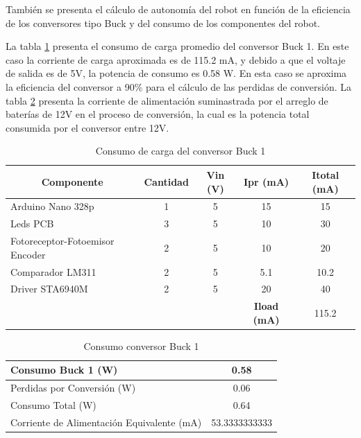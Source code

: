 También se presenta el cálculo de autonomía del robot en función de la eficiencia de los conversores tipo Buck y del consumo de los componentes del robot.

La tabla \ref{Buck1} presenta el consumo de carga promedio del conversor Buck 1. En este caso la corriente de carga aproximada es de 115.2 mA, y debido a que el voltaje de salida es de 5V, la potencia de consumo es 0.58 W. En esta caso se aproxima la eficiencia del conversor a 90\% para el cálculo de las perdidas de conversión. La tabla \ref{Buck1Perdidas} presenta la corriente de alimentación suminastrada por el arreglo de baterías de 12V en el proceso de conversión, la cual es la potencia total consumida por el conversor entre 12V.

\begin{table}[htbp]
	\caption{Consumo de carga del conversor Buck 1}
	\begin{tabular}{|l|c|c|c|c|}
		\hline
		\multicolumn{1}{|c|}{\textbf{Componente}} & \textbf{Cantidad} & \textbf{ Vin (V)} & \textbf{ Ipr (mA)} & \textbf{Itotal (mA)} \\ \hline
		Arduino Nano 328p & 1 & 5 & 15 & 15 \\ \hline
		Leds PCB & 3 & 5 & 10 & 30 \\ \hline
		Fotoreceptor-Fotoemisor Encoder & 2 & 5 & 10 & 20 \\ \hline
		Comparador LM311 & 2 & 5 & 5.1 & 10.2 \\ \hline
		Driver STA6940M & 2 & 5 & 20 & 40 \\ \hline
		& \multicolumn{1}{l|}{} & \multicolumn{1}{l|}{} & \textbf{Iload (mA)} & 115.2 \\ \hline
	\end{tabular}
	\label{Buck1}
\end{table}



\begin{table}[htbp]
	\caption{Consumo conversor Buck 1}
	\begin{tabular}{|l|c|}
		\hline
		Consumo Buck 1 (W) & 0.58 \\ \hline
		Perdidas por Conversión (W) & 0.06 \\ \hline
		Consumo Total (W) & 0.64 \\ \hline
		Corriente de Alimentación Equivalente (mA) & \multicolumn{1}{r|}{53.3333333333} \\ \hline
	\end{tabular}
	\label{Buck1Perdidas}
\end{table}


